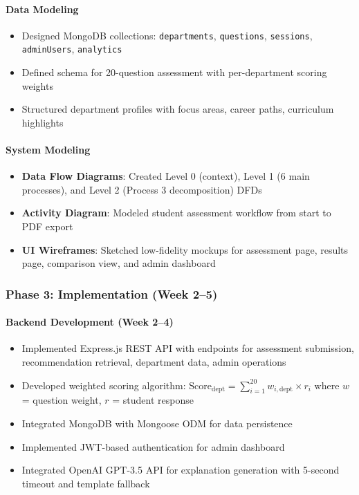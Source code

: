 \documentclass[12pt, a4paper]{article}
\begin{document}
\paragraph{Data Modeling}
\begin{itemize}[leftmargin=1.5em, itemsep=3pt]
    \item Designed MongoDB collections: \texttt{departments}, \texttt{questions}, \texttt{sessions}, \texttt{adminUsers}, \texttt{analytics}
    \item Defined schema for 20-question assessment with per-department scoring weights
    \item Structured department profiles with focus areas, career paths, curriculum highlights
\end{itemize}

\paragraph{System Modeling}
\begin{itemize}[leftmargin=1.5em, itemsep=3pt]
    \item \textbf{Data Flow Diagrams}: Created Level 0 (context), Level 1 (6 main processes), and Level 2 (Process 3 decomposition) DFDs
    \item \textbf{Activity Diagram}: Modeled student assessment workflow from start to PDF export
    \item \textbf{UI Wireframes}: Sketched low-fidelity mockups for assessment page, results page, comparison view, and admin dashboard
\end{itemize}

\subsubsection*{Phase 3: Implementation (Week 2--5)}

\paragraph{Backend Development (Week 2--4)}
\begin{itemize}[leftmargin=1.5em, itemsep=3pt]
    \item Implemented Express.js REST API with endpoints for assessment submission, recommendation retrieval, department data, admin operations
    \item Developed weighted scoring algorithm: $\text{Score}_{\text{dept}} = \sum_{i=1}^{20} w_{i,\text{dept}} \times r_i$ where $w$ = question weight, $r$ = student response
    \item Integrated MongoDB with Mongoose ODM for data persistence
    \item Implemented JWT-based authentication for admin dashboard
    \item Integrated OpenAI GPT-3.5 API for explanation generation with 5-second timeout and template fallback
\end{itemize}
\end{document}
